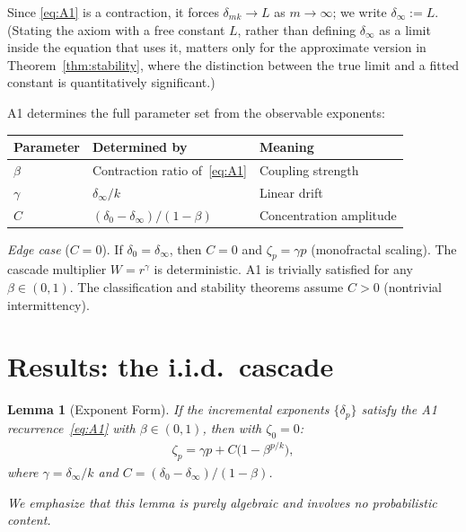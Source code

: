 \documentclass[12pt]{amsart}
\newtheorem{lemma}[theorem]{Lemma}
\theoremstyle{definition}
\theoremstyle{remark}
\begin{document}
Since \eqref{eq:A1} is a contraction, it forces
$\delta_{mk} \to L$ as $m \to \infty$; we write
$\delta_\infty := L$.  (Stating the axiom with a free constant $L$,
rather than defining $\delta_\infty$ as a limit inside the equation
that uses it, matters only for the approximate version in
Theorem~\ref{thm:stability}, where the distinction between the true
limit and a fitted constant is quantitatively significant.)

A1 determines the full parameter set from the observable exponents:
\begin{center}\small
\begin{tabular}{@{}lll@{}}
\toprule
Parameter & Determined by & Meaning \\
\midrule
$\beta$ & Contraction ratio of~\eqref{eq:A1} & Coupling strength \\
$\gamma$ & $\delta_\infty / k$ & Linear drift \\
$C$ & $(\delta_0 - \delta_\infty)/(1 - \beta)$ & Concentration amplitude \\
\bottomrule
\end{tabular}
\end{center}

\smallskip\noindent\textit{Edge case} ($C = 0$).  If $\delta_0 =
\delta_\infty$, then $C = 0$ and $\zeta_p = \gamma p$ (monofractal
scaling).  The cascade multiplier $W = r^\gamma$ is deterministic.
A1 is trivially satisfied for any $\beta \in (0,1)$.  The
classification and stability theorems assume $C > 0$ (nontrivial
intermittency).


\section{Results: the i.i.d.\ cascade}
\label{sec:results}


\begin{lemma}[Exponent Form]\label{lem:exponent}
If the incremental exponents $\{\delta_p\}$ satisfy the A1
recurrence~\eqref{eq:A1} with $\beta \in (0,1)$, then with $\zeta_0
= 0$:
\begin{align}\label{eq:zeta}
  \zeta_p = \gamma p + C\bigl(1 - \beta^{p/k}\bigr),
  \tag{$**$}
\end{align}
where $\gamma = \delta_\infty / k$ and $C = (\delta_0 -
\delta_\infty)/(1 - \beta)$.

We emphasize that this lemma is purely algebraic and involves no
probabilistic content.
\end{lemma}
\end{document}

